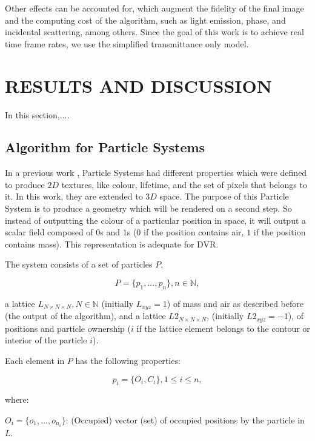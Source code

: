 \documentclass[oneside,a4paper,english,links]{amca}
\begin{document}
Other effects can be accounted for, which augment the fidelity of the
final image and the computing cost of the algorithm, such as light
emission, phase, and incidental scattering, among others. Since the
goal of this work is to achieve real time frame rates, we use the
simplified transmittance only model.

\section{RESULTS AND DISCUSSION}

In this section,....

\subsection{Algorithm for Particle Systems}
In a previous work \citep{Baravalle2011}, Particle Systems had different properties which were defined to produce $2D$ textures, like colour, lifetime, and the set of pixels that belongs to it. In this work, they are extended to $3D$ space. The purpose of this Particle System is to produce a geometry which will be rendered on a second step. So instead of outputting the colour of a particular position in space, it will output a scalar field composed of $0$s and $1$s ($0$ if the position contains air, $1$ if the position contains mass). This representation is adequate for DVR. 

The system consists of a set of particles $P$, 

\begin{equation}
P = \{p_{1}, ... , p_{n}\}, n  \in \mathbb{N},
\end{equation}

a lattice $L_{N\times N \times N}, N \in \mathbb{N} $ (initially $L_{xyz}=1$) of mass and air as described before (the output of the algorithm), and a lattice $L2_{N\times N \times N}$, (initially $L2_{xyz}=-1$), of positions and particle ownership ($i$ if the lattice element belongs to the contour or interior of the particle $i$).

Each element in $P$ has the following properties:

\begin{equation}
p_{i} = \{O_{i}, C_{i}\}, 1 \le i \le n,
\end{equation}

where:

$O_{i} = \{o_{1}, ... , o_{n_{i}}\}$: (Occupied) vector (set) of occupied positions by the particle in $L$.
\end{document}
